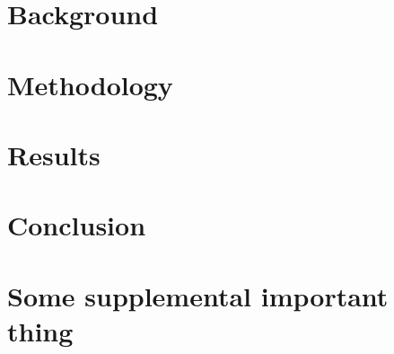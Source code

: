 \documentclass[12pt,english]{report}
\begin{document}
\chapter{Background} \label{c:background}
    

\chapter{Methodology} \label{c:method}
    

\chapter{Results} \label{c:res}
    

\chapter{Conclusion} \label{c:conclusion}
    

\printbibliography[heading=bibintoc]

\appendix
\chapter{Some supplemental important thing} \label{c:conclusion}
    
\end{document}
